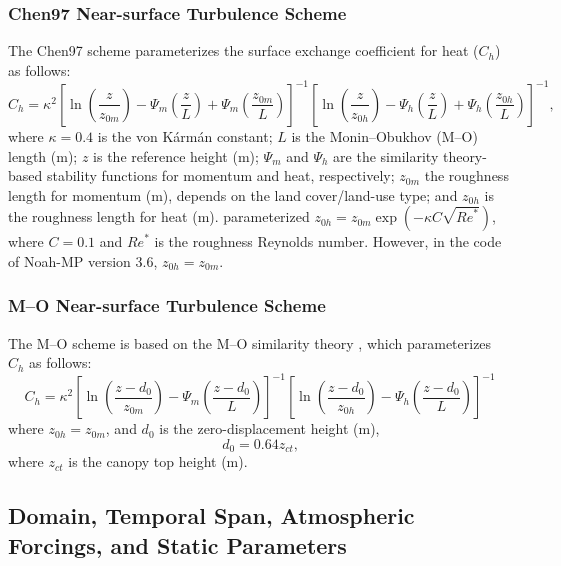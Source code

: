 \documentclass[essd, manuscript]{copernicus}
\begin{document}
\subsubsection{Chen97 Near-surface Turbulence Scheme}\label{sec:data:noahmp:chen97}

The Chen97 scheme \citep{chen1997BM} parameterizes the surface exchange coefficient for heat (\(C_{h}\)) as follows:
\begin{equation}
  C_{h} = \kappa^{2} \left[ \ln(\frac{z}{z_{0m}})
    - \Psi_{m}(\frac{z}{L})
    + \Psi_{m}(\frac{z_{0m}}{L})\right]^{-1}
  \left[\ln(\frac{z}{z_{0h}})
    - \Psi_{h}(\frac{z}{L})
    + \Psi_{h}(\frac{z_{0h}}{L})\right]^{-1}
  \text{,}
\end{equation}
where \(\kappa=0.4\) is the von Kármán constant; \(L\) is the Monin--Obukhov (M--O) length (m); \(z\) is the reference height (m); \(\Psi_{m}\) and \(\Psi_{h}\) are the similarity theory-based stability functions for momentum and heat, respectively; \(z_{0m}\) the roughness length for momentum (m), depends on the land cover/land-use type; and \(z_{0h}\) is the roughness length for heat (m). \citet{niu2011JGRA} parameterized \(z_{0h} = z_{0m} \exp(-\kappa C \sqrt{{Re}^*})\), where \(C=0.1\) and \({Re}^*\) is the roughness Reynolds number. However, in the code of Noah-MP version 3.6, \(z_{0h} = z_{0m}\).

\subsubsection{M--O Near-surface Turbulence Scheme}\label{sec:data:noahmp:mo}

The M--O scheme is based on the M--O similarity theory \citep{brutsaert1982}, which parameterizes \(C_h\) as follows:
\begin{equation}
  C_h = \kappa^2 \left[ \ln(\frac{z - d_{0}}{z_{0m}})
    - \Psi_{m}(\frac{z - d_0}{L})\right]^{-1}
  \left[\ln(\frac{z - d_0}{z_{0h}})
    -\Psi_{h}(\frac{z - d_0}{L})\right]^{-1}
\end{equation}
where \(z_{0h} = z_{0m}\), and \(d_0\) is the zero-displacement height (m),
\begin{equation}
  d_0 = 0.64 z_{ct}
  \text{,}
\end{equation}
where \(z_{ct}\) is the canopy top height (m).

\subsection{Domain, Temporal Span, Atmospheric Forcings, and Static Parameters}\label{sec:data:static}
\end{document}
